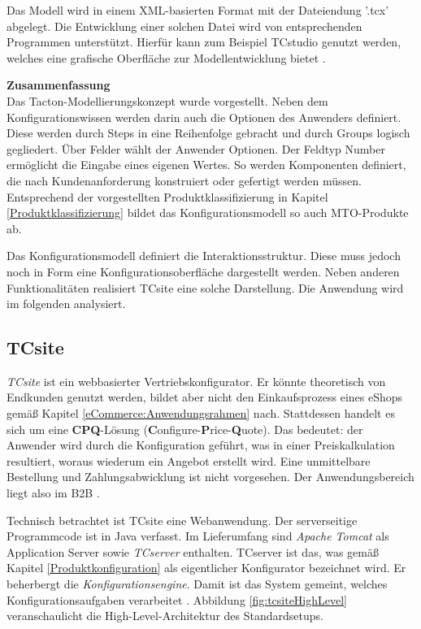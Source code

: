 \documentclass[11pt, a4paper, titlepage, listof=totoc, bibliography=totoc, index=totoc, twoside, openright, headings=normal, draft]{scrreprt}
\begin{document}
Das Modell wird in einem XML-basierten Format mit der Dateiendung '.tcx' abgelegt. Die Entwicklung einer solchen Datei wird von entsprechenden Programmen unterstützt. Hierfür kann zum Beispiel \glqq TCstudio\grqq{} genutzt werden, welches eine grafische Oberfläche zur Modellentwicklung bietet \citep{tactonAbout}.

\textbf{Zusammenfassung}\\
Das Tacton-Modellierungskonzept wurde vorgestellt. Neben dem Konfigurationswissen werden darin auch die Optionen des Anwenders definiert. Diese werden durch Steps in eine Reihenfolge gebracht und durch Groups logisch gegliedert. Über Felder wählt der Anwender Optionen. Der Feldtyp Number ermöglicht die Eingabe eines eigenen Wertes. So werden Komponenten definiert, die nach Kundenanforderung konstruiert oder gefertigt werden müssen. Entsprechend der vorgestellten Produktklassifizierung in Kapitel \ref{Produktklassifizierung} bildet das Konfigurationsmodell so auch \ac{MTO}-Produkte ab.

Das Konfigurationsmodell definiert die Interaktionsstruktur. Diese muss jedoch noch in Form eine Konfigurationsoberfläche dargestellt werden. Neben anderen Funktionalitäten realisiert TCsite eine solche Darstellung. Die Anwendung wird im folgenden analysiert.

\subsection{TCsite}
\label{TCsite}
\emph{TCsite} ist ein webbasierter Vertriebskonfigurator. Er könnte theoretisch von Endkunden genutzt werden, bildet aber nicht den Einkaufsprozess eines eShops gemäß Kapitel \ref{eCommerce:Anwendungsrahmen} nach. Stattdessen handelt es sich um eine \textbf{CPQ}-Lösung (\textbf{C}onfigure-\textbf{P}rice-\textbf{Q}uote). Das bedeutet: der Anwender wird durch die Konfiguration geführt, was in einer Preiskalkulation resultiert, woraus wiederum ein Angebot erstellt wird. Eine unmittelbare Bestellung und Zahlungsabwicklung ist nicht vorgesehen. Der Anwendungsbereich liegt also im B2B \citep{tactonAbout}.

Technisch betrachtet ist TCsite eine Webanwendung. Der serverseitige Programmcode ist in Java verfasst. Im Lieferumfang sind \emph{Apache Tomcat} als Application Server sowie \emph{TCserver} enthalten. TCserver ist das, was gemäß Kapitel \ref{Produktkonfiguration} als eigentlicher Konfigurator bezeichnet wird. Er beherbergt die \emph{Konfigurationsengine}. Damit ist das System gemeint, welches Konfigurationsaufgaben verarbeitet \citep{tactonTCsiteHandbook}. Abbildung \ref{fig:tcsiteHighLevel} veranschaulicht die High-Level-Architektur des Standardsetups.
\end{document}

